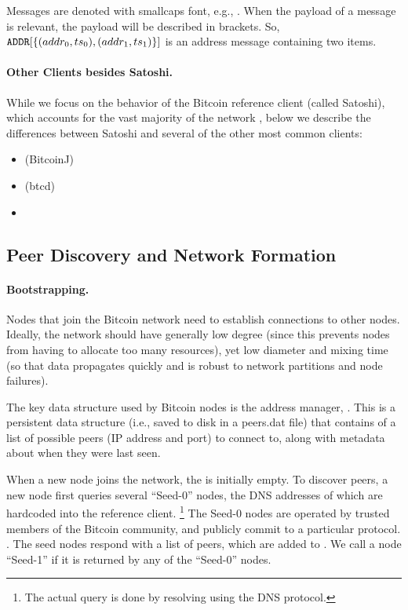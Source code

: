 Messages are denoted with smallcaps font, e.g., . When the payload of a message is relevant, the payload will be described in brackets. So, $\msg{addr}[\{(addr_0,ts_0),(addr_1,ts_1)\}]$ is an address message containing two items.


\paragraph{Other Clients besides Satoshi.} While we focus on the behavior of the Bitcoin reference client (called Satoshi), which accounts for the vast majority of the network , below we describe the differences between Satoshi and several of the other most common clients:
\begin{itemize}
\item (BitcoinJ)
\item (btcd) 
\item {}
\end{itemize}


\subsection{Peer Discovery and Network Formation}

\paragraph{Bootstrapping.}
Nodes that join the Bitcoin network need to establish connections to other nodes. Ideally, the network should have generally low degree (since this prevents nodes from having to allocate too many resources), yet low diameter and mixing time (so that data propagates quickly and is robust to network partitions and node failures).

The key data structure used by Bitcoin nodes is the address manager, . This is a persistent data structure (i.e., saved to disk in a \textsf{peers.dat} file) that contains of a list of possible peers (IP address and port) to connect to, along with metadata about when they were last seen. 

When a new node joins the network, the  is initially empty.
To discover peers, a new node first queries several ``Seed-0'' nodes, the DNS addresses of which are hardcoded into the reference client.
\footnote{The actual query is done by resolving using the DNS protocol.}
The Seed-0 nodes are operated by trusted members of the Bitcoin community, and publicly commit to a particular protocol. .
The seed nodes respond with a list of peers, which are added to . We call a node ``Seed-1'' if it is returned by any of the ``Seed-0'' nodes.

